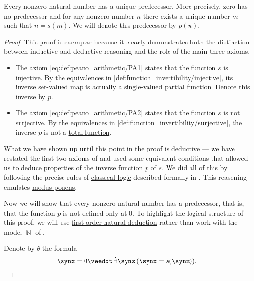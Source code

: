 \begin{proposition}\label{thm:nonzero_natural_numbers_have_predecessors}
  Every nonzero natural number has a unique predecessor. More precisely, zero has no predecessor and for any nonzero number \( n \) there exists a unique number \( m \) such that \( n = s(m) \). We will denote this predecessor by \( p(n) \).
\end{proposition}
\begin{proof}
  This proof is exemplar because it clearly demonstrates both the distinction between inductive and deductive reasoning and the role of the main three axioms.

  \begin{itemize}
    \item The axiom \eqref{eq:def:peano_arithmetic/PA1} states that the function \( s \) is injective. By the equivalences in \cref{def:function_invertibility/injective}, its \hyperref[def:set_valued_map/inverse]{inverse set-valued map} is actually a \hyperref[def:set_valued_map/partial]{single-valued partial function}. Denote this inverse by \( p \).

    \item The axiom \eqref{eq:def:peano_arithmetic/PA2} states that the function \( s \) is not surjective. By the equivalences in \cref{def:function_invertibility/surjective}, the inverse \( p \) is not a \hyperref[def:set_valued_map/partial]{total function}.
  \end{itemize}

  What we have shown up until this point in the proof is deductive --- we have restated the first two axioms of  and used some equivalent conditions that allowed us to deduce properties of the inverse function \( p \) of \( s \). We did all of this by following the precise rules of \hyperref[con:classical_logic]{classical logic} described formally in . This reasoning emulates \hyperref[inf:thm:axiomatic_derivation_as_natural_deduction/mp]{modus ponens}.

  Now we will show that every nonzero natural number has a predecessor, that is, that the function \( p \) is not defined only at \( 0 \). To highlight the logical structure of this proof, we will use \hyperref[def:first_order_natural_deduction_system]{first-order natural deduction} rather than work with the model \( \BbbN \) of .

  Denote by \( \theta \) the formula
  \begin{equation*}
    \synx \syneq 0 \synvee \qexists \synz (\synx \syneq s(\synz)).
  \end{equation*}


\end{proof}
